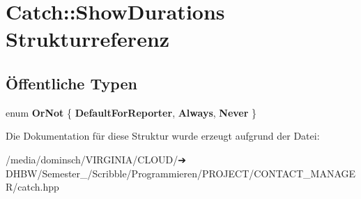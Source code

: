 \hypertarget{structCatch_1_1ShowDurations}{}\section{Catch\+:\+:Show\+Durations Strukturreferenz}
\label{structCatch_1_1ShowDurations}
\subsection*{Öffentliche Typen}
\begin{DoxyCompactItemize}
\item 
\mbox{\label{structCatch_1_1ShowDurations_a82fa0174554187220c1eda175f122ee1}} 
enum {\bfseries Or\+Not} \{ {\bfseries Default\+For\+Reporter}, 
{\bfseries Always}, 
{\bfseries Never}
 \}
\end{DoxyCompactItemize}


Die Dokumentation für diese Struktur wurde erzeugt aufgrund der Datei\+:\begin{DoxyCompactItemize}
\item 
/media/dominsch/\+V\+I\+R\+G\+I\+N\+I\+A/\+C\+L\+O\+U\+D/➔ D\+H\+B\+W/\+Semester\+\_/\+Scribble/\+Programmieren/\+P\+R\+O\+J\+E\+C\+T/\+C\+O\+N\+T\+A\+C\+T\+\_\+\+M\+A\+N\+A\+G\+E\+R/catch.\+hpp\end{DoxyCompactItemize}
